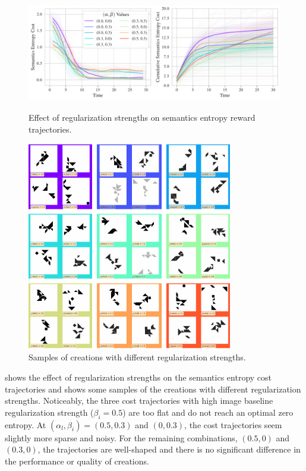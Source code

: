 \begin{figure}[H]
    \centering
    \includegraphics[width=\textwidth]{images/alpha_beta_comparison.pdf}
    \caption{Effect of regularization strengths on semantics entropy reward trajectories.}
    \label{fig:alpha-beta-trajectories}
    \vspace{12pt}
    \includegraphics[width=0.8\textwidth]{images/alpha_beta_samples.pdf}
    \caption{Samples of creations with different regularization strengths.}
    \label{fig:alpha-beta-samples}
\end{figure}
\vspace{-11pt}

 shows the effect of regularization strengths on the semantics entropy cost trajectories and  shows some samples of the creations with different regularization strengths.
Noticeably, the three cost trajectories with high image baseline regularization strength (\(\beta_{i} = 0.5\)) are too flat and do not reach an optimal zero entropy.
At \((\alpha_{l}, \beta_{i}) = (0.5, 0.3)\) and \((0, 0.3)\), the cost trajectories seem slightly more sparse and noisy.
For the remaining combinations, \((0.5, 0)\) and \((0.3, 0)\), the trajectories are well-shaped and there is no significant difference in the performance or quality of creations.

